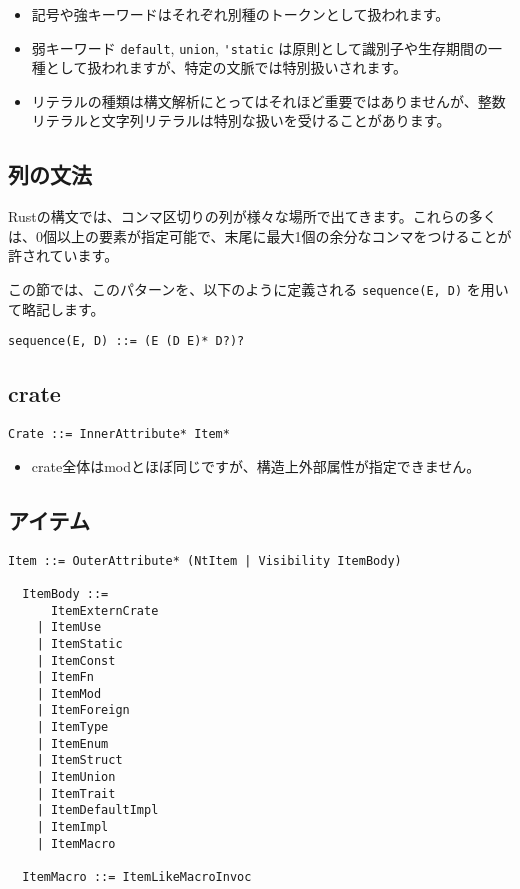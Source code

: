 \documentclass[dvipdfmx,uplatex,papersize,a4paper,10pt]{jsbook}
\theoremstyle{definition}
\begin{document}
\begin{itemize}
  \item 記号や強キーワードはそれぞれ別種のトークンとして扱われます。
  \item 弱キーワード \verb|default|, \verb|union|, \verb|'static| は原則として識別子や生存期間の一種として扱われますが、特定の文脈では特別扱いされます。
  \item リテラルの種類は構文解析にとってはそれほど重要ではありませんが、整数リテラルと文字列リテラルは特別な扱いを受けることがあります。
\end{itemize}

\subsection{列の文法}

Rustの構文では、コンマ区切りの列が様々な場所で出てきます。これらの多くは、0個以上の要素が指定可能で、末尾に最大1個の余分なコンマをつけることが許されています。

この節では、このパターンを、以下のように定義される \verb|sequence(E, D)| を用いて略記します。

\begin{lstlisting}[language=BNFLike, gobble=2]
  sequence(E, D) ::= (E (D E)* D?)?
\end{lstlisting}

\subsection{crate}

\begin{lstlisting}[language=BNFLike, gobble=2]
  Crate ::= InnerAttribute* Item*
\end{lstlisting}

\begin{itemize}
  \item crate全体はmodとほぼ同じですが、構造上外部属性が指定できません。
\end{itemize}

\subsection{アイテム}

\begin{lstlisting}[language=BNFLike, gobble=2]
  Item ::= OuterAttribute* (NtItem | Visibility ItemBody)

  ItemBody ::=
      ItemExternCrate
    | ItemUse
    | ItemStatic
    | ItemConst
    | ItemFn
    | ItemMod
    | ItemForeign
    | ItemType
    | ItemEnum
    | ItemStruct
    | ItemUnion
    | ItemTrait
    | ItemDefaultImpl
    | ItemImpl
    | ItemMacro

  ItemMacro ::= ItemLikeMacroInvoc
\end{lstlisting}
\end{document}
